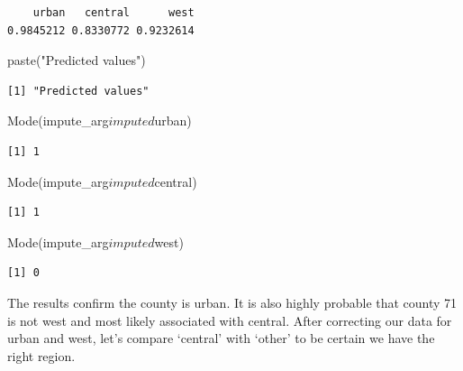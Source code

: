 \documentclass[]{article}
\newenvironment{Shaded}{}{}
\newcommand{\KeywordTok}[1]{\textcolor[rgb]{0.00,0.00,1.00}{#1}}
\newcommand{\NormalTok}[1]{#1}
\newcommand{\OperatorTok}[1]{#1}
\newcommand{\StringTok}[1]{\textcolor[rgb]{0.00,0.50,0.50}{#1}}
\begin{document}
\begin{verbatim}
    urban   central      west 
0.9845212 0.8330772 0.9232614 
\end{verbatim}

\begin{Shaded}
\begin{Highlighting}[]
\KeywordTok{paste}\NormalTok{(}\StringTok{"Predicted values"}\NormalTok{)}
\end{Highlighting}
\end{Shaded}

\begin{verbatim}
[1] "Predicted values"
\end{verbatim}

\begin{Shaded}
\begin{Highlighting}[]
\KeywordTok{Mode}\NormalTok{(impute_arg}\OperatorTok{$}\NormalTok{imputed}\OperatorTok{$}\NormalTok{urban)}
\end{Highlighting}
\end{Shaded}

\begin{verbatim}
[1] 1
\end{verbatim}

\begin{Shaded}
\begin{Highlighting}[]
\KeywordTok{Mode}\NormalTok{(impute_arg}\OperatorTok{$}\NormalTok{imputed}\OperatorTok{$}\NormalTok{central)}
\end{Highlighting}
\end{Shaded}

\begin{verbatim}
[1] 1
\end{verbatim}

\begin{Shaded}
\begin{Highlighting}[]
\KeywordTok{Mode}\NormalTok{(impute_arg}\OperatorTok{$}\NormalTok{imputed}\OperatorTok{$}\NormalTok{west)}
\end{Highlighting}
\end{Shaded}

\begin{verbatim}
[1] 0
\end{verbatim}

The results confirm the county is urban. It is also highly probable that
county 71 is not west and most likely associated with central. After
correcting our data for urban and west, let's compare `central' with
`other' to be certain we have the right region.
\end{document}
